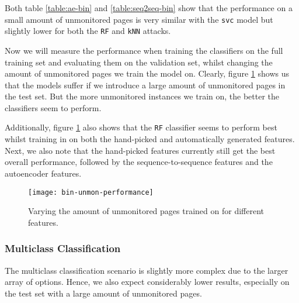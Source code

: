 Both table \ref{table:ae-bin} and \ref{table:seq2seq-bin} show that the performance on a small amount of unmonitored pages is very similar with the \texttt{svc} model but slightly lower for both the \texttt{RF} and \texttt{kNN} attacks.

Now we will measure the performance when training the classifiers on the full training set and evaluating them on the validation set, whilst changing the amount of unmonitored pages we train the model on.
Clearly, figure \ref{fig:bin-unmon-performance} shows us that the models suffer if we introduce a large amount of unmonitored pages in the test set.
But the more unmonitored instances we train on, the better the classifiers seem to perform.

Additionally, figure \ref{fig:bin-unmon-performance} also shows that the \texttt{RF} classifier seems to perform best whilst training in on both the hand-picked and automatically generated features.
Next, we also note that the hand-picked features currently still get the best overall performance, followed by the sequence-to-sequence features and the autoencoder features.

\begin{figure}[ht]
  \centering
  \texttt{[image: bin-unmon-performance]}
  \caption{Varying the amount of unmonitored pages trained on for different features.}
  \label{fig:bin-unmon-performance}
\end{figure}

\subsubsection{Multiclass Classification}

The multiclass classification scenario is slightly more complex due to the larger array of options.
Hence, we also expect considerably lower results, especially on the test set with a large amount of unmonitored pages.

